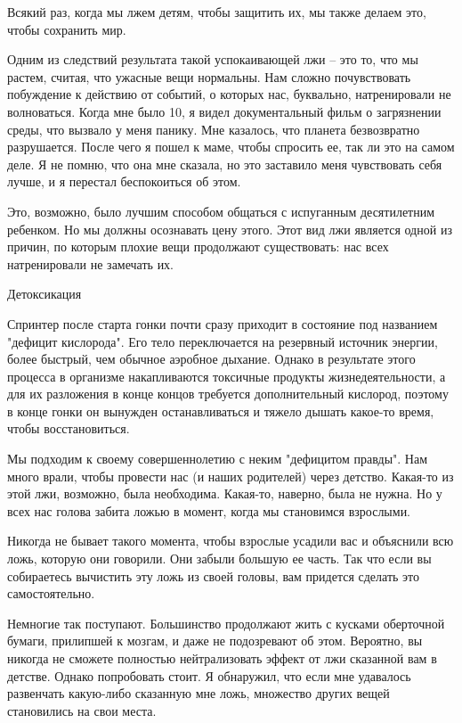 \documentclass[ebook,12pt,oneside,openany]{memoir}
\begin{document}
Всякий раз, когда мы лжем детям, чтобы защитить их, мы также делаем
это, чтобы сохранить мир.

Одним из следствий результата такой успокаивающей лжи -- это то, что
мы растем, считая, что ужасные вещи нормальны. Нам сложно
почувствовать побуждение к действию от событий, о которых нас,
буквально, натренировали не волноваться. Когда мне было 10, я видел
документальный фильм о загрязнении среды, что вызвало у меня панику.
Мне казалось, что планета безвозвратно разрушается. После чего я пошел
к маме, чтобы спросить ее, так ли это на самом деле. Я не помню, что
она мне сказала, но это заставило меня чувствовать себя лучше, и я
перестал беспокоиться об этом.

Это, возможно, было лучшим способом общаться с испуганным десятилетним
ребенком. Но мы должны осознавать цену этого. Этот вид лжи является
одной из причин, по которым плохие вещи продолжают существовать: нас
всех натренировали не замечать их.

Детоксикация

Спринтер после старта гонки почти сразу приходит в состояние под
названием "дефицит кислорода". Его тело переключается на резервный
источник энергии, более быстрый, чем обычное аэробное дыхание. Однако
в результате этого процесса в организме накапливаются токсичные
продукты жизнедеятельности, а для их разложения в конце концов
требуется дополнительный кислород, поэтому в конце гонки он вынужден
останавливаться и тяжело дышать какое-то время, чтобы восстановиться.

Мы подходим к своему совершеннолетию с неким "дефицитом правды". Нам
много врали, чтобы провести нас (и наших родителей) через детство.
Какая-то из этой лжи, возможно, была необходима. Какая-то, наверно,
была не нужна. Но у всех нас голова забита ложью в момент, когда мы
становимся взрослыми.

Никогда не бывает такого момента, чтобы взрослые усадили вас и
объяснили всю ложь, которую они говорили. Они забыли большую ее часть.
Так что если вы собираетесь вычистить эту ложь из своей головы, вам
придется сделать это самостоятельно.

Немногие так поступают. Большинство продолжают жить с кусками
оберточной бумаги, прилипшей к мозгам, и даже не подозревают об этом.
Вероятно, вы никогда не сможете полностью нейтрализовать эффект от лжи
сказанной вам в детстве. Однако попробовать стоит. Я обнаружил, что
если мне удавалось развенчать какую-либо сказанную мне ложь, множество
других вещей становились на свои места.
\end{document}

